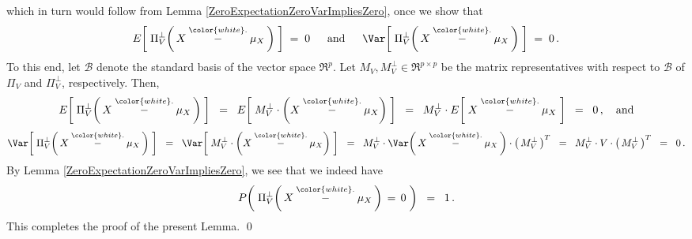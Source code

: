 which in turn would follow from Lemma \ref{ZeroExpectationZeroVarImpliesZero}, once we show that
\begin{equation*}
E\!\left[\;\Pi^{\perp}_{V}\!\left(\,X \overset{{\color{white}.}}{-} \mu_{X}\,\right)\;\right] \; = \; 0
\quad\;\;\textnormal{and}\quad\;\;
\Var\!\left[\;\Pi^{\perp}_{V}\!\left(\,X \overset{{\color{white}.}}{-} \mu_{X}\,\right)\;\right] \; = \; 0\,.
\end{equation*}
To this end, let $\mathcal{B}$ denote the standard basis of the vector space $\Re^{p}$.
Let $M_{V}, M^{\perp}_{V} \in \Re^{p \times p}$ be the matrix representatives with respect to $\mathcal{B}$
of $\Pi_{V}$ and $\Pi^{\perp}_{V}$, respectively.
Then,
\begin{equation*}
E\!\left[\;\Pi^{\perp}_{V}\!\left(\,X \overset{{\color{white}.}}{-} \mu_{X}\,\right)\;\right]
\;\;=\;\; E\!\left[\;M^{\perp}_{V}\cdot\left(X\overset{{\color{white}.}}{-}\mu_{X}\right)\;\right]
\;\;=\;\; M^{\perp}_{V} \cdot E\!\left[\;X\overset{{\color{white}.}}{-}\mu_{X}\;\right]
\;\;=\;\; 0\,,
\quad\textnormal{and}
\end{equation*}
\begin{equation*}
\Var\!\left[\;\Pi^{\perp}_{V}\!\left(\,X \overset{{\color{white}.}}{-} \mu_{X}\,\right)\;\right]
\;\;=\;\; \Var\!\left[\;M^{\perp}_{V}\cdot\left(X\overset{{\color{white}.}}{-}\mu_{X}\right)\;\right]
\;\;=\;\; M^{\perp}_{V} \cdot \Var\!\left(\,X\overset{{\color{white}.}}{-}\mu_{X}\,\right) \cdot \left(\,M^{\perp}_{V}\,\right)^{T}
\;\;=\;\; M^{\perp}_{V} \cdot V \cdot \left(\,M^{\perp}_{V}\,\right)^{T}
\;\;=\;\; 0\,.
\end{equation*}
By Lemma \ref{ZeroExpectationZeroVarImpliesZero}, we see that we indeed have
\begin{equation*}
P\!\left(\;\Pi^{\perp}_{V}\!\left(\,X \overset{{\color{white}.}}{-} \mu_{X}\,\right) \,=\, 0 \;\right)
\;\;=\;\; 1 \,.
\end{equation*}
This completes the proof of the present Lemma.
\qed


